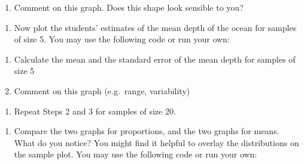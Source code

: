 \documentclass[letterpaper,12pt,twoside,]{pinp}
\providecommand{\tightlist}{%
  \setlength{\itemsep}{0pt}\setlength{\parskip}{0pt}}
\begin{document}
\begin{enumerate}
\def\labelenumi{\alph{enumi})}
\tightlist
\item
  Comment on this graph. Does this shape look sensible to you?
\end{enumerate}

\begin{enumerate}
\def\labelenumi{\arabic{enumi}.}
\setcounter{enumi}{2}
\tightlist
\item
  Now plot the students' estimates of the mean depth of the ocean for
  samples of size 5. You may use the following code or run your own:
\end{enumerate}

\begin{Shaded}
\begin{Highlighting}[]
\StringTok{ }\NormalTok{(}\NormalTok{,}\NormalTok{,}\NormalTok{)}
\NormalTok{(water_results[,}\NormalTok{], }
      \NormalTok{(}\NormalTok{,}\NormalTok{),}
      \NormalTok{(}\OperatorTok{/}\NormalTok{), }
      \NormalTok{,}
      \NormalTok{)}
\end{Highlighting}
\end{Shaded}

\begin{enumerate}
\def\labelenumi{\alph{enumi})}
\tightlist
\item
  Calculate the mean and the standard error of the mean depth for
  samples of size 5
\item
  Comment on this graph (e.g.~range, variability)
\end{enumerate}

\begin{enumerate}
\def\labelenumi{\arabic{enumi}.}
\setcounter{enumi}{3}
\tightlist
\item
  Repeat Steps 2 and 3 for samples of size 20.
\end{enumerate}

\begin{enumerate}
\def\labelenumi{\alph{enumi})}
\tightlist
\item
  Compare the two graphs for proportions, and the two graphs for means.
  What do you notice? You might find it helpful to overlay the
  distributions on the sample plot. You may use the following code or
  run your own:
\end{enumerate}
\end{document}
